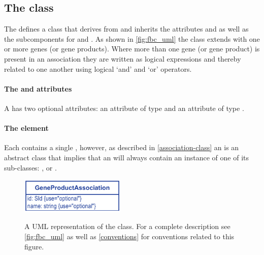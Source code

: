 %


%

%


\subsection{The \FBC {} class}
\label{geneproductassociation-class}

The \FBCPackage defines a \GeneProductAssociation class that derives
from \SBase and inherits the attributes  and 
as well as the subcomponents for \Annotation and \Notes. As shown in
\ref{fig:fbc_uml} the \GeneProductAssociation class extends \Reaction with
one or more genes (or gene products). Where more than one gene (or gene product) is present in an association they are written as logical expressions and thereby related to one another using logical `and' and `or' operators.

\paragraph{The  and  attributes}
A \GeneProductAssociation has two optional attributes:  an attribute of
type  and  an attribute of type .


\paragraph{The  element}
Each \GeneProductAssociation contains a single \Association, however, as
described in \ref{association-class} an \Association is an abstract class
that implies that an  will always contain an instance
of one of its sub-classes: \GeneAnd, \GeneOr or \GeneProductRef.
%
\begin{figure}[h!]
  \centering
  \includegraphics[width=5cm]{images/v2harmony_fbc_geneproductassociation.pdf}\\
  \caption{A UML representation of the \FBCPackage \GeneProductAssociation class.
	For a complete description see \ref{fig:fbc_uml} as well as \ref{conventions} for conventions related to this figure.}
  \label{fig:fbc_uml_ga}
\end{figure}

